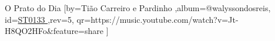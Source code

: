 \beginsong
{O Prato do Dia %
}[by={Tião Carreiro e Pardinho %
},album={@walyssondosreis},
id={\href{https://music.youtube.com/watch?v=Jt-H8QO2HFo&feature=share %
}{ST0133 %
}},rev={5}, %
qr={https://music.youtube.com/watch?v=Jt-H8QO2HFo&feature=share %
}]
\beginverse
